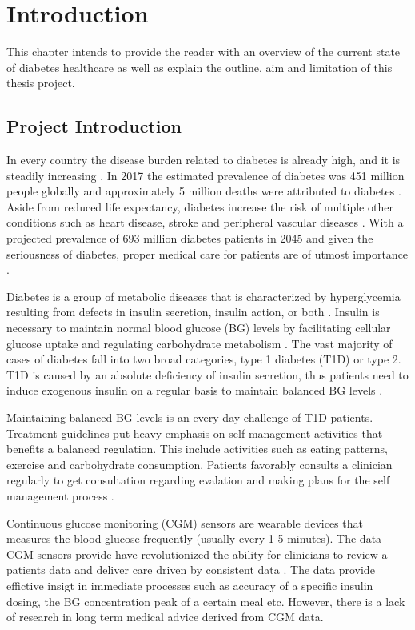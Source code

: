 \chapter{Introduction}

This chapter intends to provide the reader with an overview of the current state of diabetes healthcare as well as explain the outline, aim and limitation of this thesis project.

\section{Project Introduction}

In every country the disease burden related to diabetes is already high, and it is steadily increasing \parencite{Forouhi2014}.
In 2017 the estimated prevalence of diabetes was 451 million people globally and approximately 5 million deaths were attributed to diabetes \parencite{Cho2018}.
Aside from reduced life expectancy, diabetes increase the risk of multiple other conditions such as heart disease, stroke and peripheral vascular diseases \parencite{Forouhi2014}.
With a projected prevalence of 693 million diabetes patients in 2045 and given the seriousness of diabetes, proper medical care for patients are of utmost importance \parencite{Cho2018}.

Diabetes is a group of metabolic diseases that is characterized by hyperglycemia resulting from defects in insulin secretion, insulin action, or both \parencite{ADA2010}.
Insulin is necessary to maintain normal blood glucose (BG) levels by facilitating cellular glucose uptake and regulating carbohydrate metabolism \parencite{Wilcox2005}.
The vast majority of cases of diabetes fall into two broad categories, type 1 diabetes (T1D) or type 2.
T1D is caused by an absolute deficiency of insulin secretion, thus
patients need to induce exogenous insulin on a regular basis to maintain balanced BG levels \parencite{ADA2010}.

Maintaining balanced BG levels is an every day challenge of T1D patients.
Treatment guidelines put heavy emphasis on self management activities that benefits a balanced regulation.
This include activities such as eating patterns, exercise and carbohydrate consumption.
Patients favorably consults a clinician regularly to get consultation regarding evalation and making plans for the self management process \parencite{Cooke2013}.


Continuous glucose monitoring (CGM) sensors are wearable devices that measures the blood glucose frequently (usually every 1-5 minutes).
The data CGM sensors provide have revolutionized the ability for clinicians to review a patients data and deliver care driven by consistent data \parencite{Facchinetti2016}.
The data provide effictive insigt in immediate processes such as accuracy of a specific insulin dosing, the BG concentration peak of a certain meal etc.
However, there is a lack of research in long term medical advice derived from CGM data.

